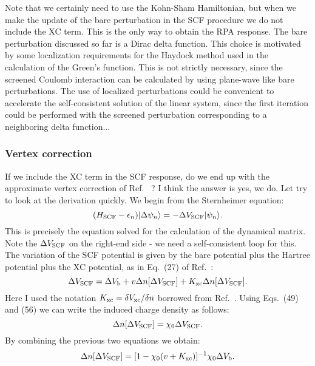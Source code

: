 \documentclass[12pt]{article}
\begin{document}
%
Note that we certainly need to use the Kohn-Sham Hamiltonian, but when we make the update of the bare perturbation
in the SCF procedure we do not include the XC term. This is the only way to obtain the RPA response. 
The bare perturbation discussed so far is a Dirac delta function. This choice is motivated by some
localization requirements for the Haydock method used in the calculation of the Green's function.
This is not strictly necessary, since the screened Coulomb interaction
can be calculated by using plane-wave like bare perturbations. The use of localized perturbations
could be convenient to accelerate the self-consistent solution of the linear system, since the first
iteration could be performed with the screened perturbation corresponding to a neighboring delta function...

\subsubsection*{Vertex correction}
If we include the XC term in the SCF response, do we end up with the approximate vertex correction 
of Ref.\ \cite{hl86} ? I think the answer is yes, we do. Let try to look at the derivation quickly.
We begin from the Sternheimer equation:
 \begin{equation} 
  (H_{\rm SCF} - \epsilon_n ) | \Delta \psi_n \rangle =
  - \Delta V_{\rm SCF} | \psi_n \rangle.
  \end{equation}
This is precisely the equation solved for the calculation of the dynamical matrix.
Note the $\Delta V_{\rm SCF}$ on the right-end side - we need a self-consistent loop for this.
The variation of the SCF potential is given by the bare potential plus the Hartree potential plus
the XC potential, as in Eq.\ (27) of Ref.\ \cite{baroni}:
 \begin{equation}
 \Delta V_{\rm SCF} = \Delta V_{\rm b} + v\Delta n[\Delta V_{\rm SCF}] + K_{\rm xc} \Delta n[\Delta V_{\rm SCF}].
 \end{equation}
Here I used the notation $K_{\rm xc}=\delta V_{\rm xc}/\delta n$ borrowed from Ref.\ \cite{hl86}.
Using Eqs.\ (49) and (56) we can write the induced charge density as follows:
 \begin{equation}
 \Delta n[\Delta V_{\rm SCF}] = \chi_0 \Delta V_{\rm SCF}.
 \end{equation}
By combining the previous two equations we obtain:
 \begin{equation}
 \Delta n[\Delta V_{\rm SCF}] = [1-\chi_0 (v+K_{\rm xc})]^{-1}\chi_0 \Delta V_{\rm b}.
 \end{equation}
\end{document}
